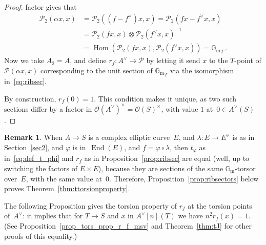 \documentclass[11pt]{article}
\providecommand{\G}{}
\let\mathcal\mathscr
\let\oldvee\vee
\renewcommand{\vee}{{\scriptscriptstyle\oldvee}}
\theoremstyle{plain}
\theoremstyle{definition}
\newtheorem{Remark}[subsection]{Remark}
\numberwithin{equation}{subsection}
\let\phi\varphi
\renewcommand{\G}{\mathbb G}
\newcommand{\calO}{\mathcal{O}}
\newcommand{\calP}{\mathcal{P}}
\newcommand{\Gm}{\G_{\mathrm{m}}}
\DeclareMathOperator{\End}{End}
\DeclareMathOperator{\Hom}{Hom}
\begin{document}
\begin{proof}
factor gives that
\begin{equation}\label{eq:ribsec}
\begin{split}
\calP_2(\alpha x,x) &= \calP_2((f-f^\vee)x,x) = \calP_2(fx - f^\vee x,x) \\
&= \calP_2(fx,x)\otimes\calP_2(f^\vee x,x)^{-1}\\
&
=\Hom(\calP_2(fx,x),\calP_2(f^\vee x,x)) = {\Gm}_T\, .
\end{split}
\end{equation}
Now we take $A_2=A$, and define $r_f\colon A^\vee \to \calP$ by
letting it send $x$ to the $T$-point of $\calP(\alpha x,x)$
corresponding to the unit section of ${\Gm}_T$ via the isomorphism
in~\eqref{eq:ribsec}.

By construction, $r_f(0)=1$. This condition makes it unique, as two
such sections differ by a factor in $\calO(A^\vee)^\times=\calO(S)^\times$,
with value $1$ at~$0\in A^\vee(S)$.
\end{proof}

\begin{Remark}
When $A \rightarrow S$ is a complex elliptic curve~$E$, and
$\lambda\colon E\to E^\vee$ is as in Section~\ref{sec2}, and $\phi$ is
in~$\End(E)$, and $f=\phi\circ\lambda$, then $t_\phi$ as
in~\eqref{eq:def_t_phi} and $r_f$ as in Proposition~\ref{prop:ribsec} are
equal (well, up to switching the factors of $E\times E$), because they
are sections of the same $\Gm$-torsor over~$E$, with the same value
at~$0$. Therefore, Proposition~\ref{prop:ribsectors} below proves
Theorem~\ref{thm:ttorsionproperty}.
\end{Remark}

The following Proposition gives the torsion property of $r_f$ at the
torsion points of~$A^\vee$: it implies that for $T\to S$ and $x$ in
$A^\vee[n](T)$ we have $n^2r_f(x)=1$. (See
Proposition~\ref{prop_tors_prop_r_f_msv} and Theorem~\ref{thm:tJ} for
other proofs of this equality.)
\end{document}
